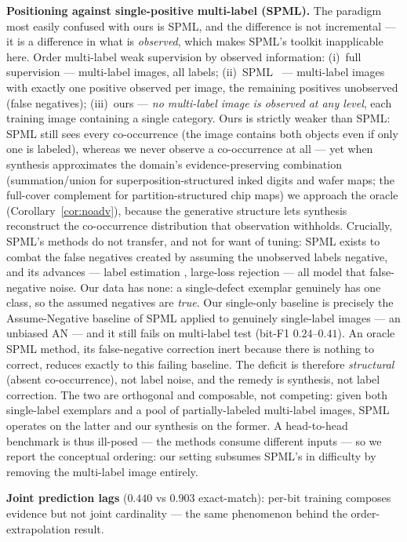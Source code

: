 \documentclass[11pt]{article}
\begin{document}
\textbf{Positioning against single-positive multi-label (SPML).} The
paradigm most easily confused with ours is SPML, and the difference is not
incremental --- it is a difference in what is \emph{observed}, which makes
SPML's toolkit inapplicable here. Order multi-label weak supervision by
observed information: (i)~full supervision --- multi-label images, all
labels; (ii)~SPML~\cite{cole2021spml,kim2022largeloss} --- multi-label
images with exactly one positive observed per image, the remaining positives
unobserved (false negatives); (iii)~ours --- \emph{no multi-label image is
observed at any level}, each training image containing a single category.
Ours is strictly weaker than SPML: SPML still sees every co-occurrence (the
image contains both objects even if only one is labeled), whereas we never
observe a co-occurrence at all --- yet when synthesis approximates the domain's
evidence-preserving combination (summation/union for superposition-structured inked
digits and wafer maps; the full-cover complement for partition-structured chip maps)
we approach the oracle
(Corollary~\ref{cor:noadv}), because the generative structure lets synthesis
reconstruct the co-occurrence distribution that observation withholds. Crucially, SPML's methods do not transfer, and not for want of
tuning: SPML exists to combat the false negatives created by assuming the
unobserved labels negative, and its advances --- label estimation
\cite{cole2021spml}, large-loss rejection \cite{kim2022largeloss} --- all
model that false-negative noise. Our data has none: a single-defect exemplar
genuinely has one class, so the assumed negatives are \emph{true}. Our
single-only baseline is precisely the Assume-Negative baseline of SPML applied
to genuinely single-label images --- an unbiased AN --- and it still fails on
multi-label test (bit-F1 $0.24$--$0.41$). An oracle SPML method, its
false-negative correction inert because there is nothing to correct, reduces
exactly to this failing baseline. The deficit is therefore \emph{structural}
(absent co-occurrence), not label noise, and the remedy is synthesis, not
label correction. The two are orthogonal and composable, not competing: given
both single-label exemplars and a pool of partially-labeled multi-label
images, SPML operates on the latter and our synthesis on the former. A
head-to-head benchmark is thus ill-posed --- the methods consume different
inputs --- so we report the conceptual ordering: our setting subsumes SPML's
in difficulty by removing the multi-label image entirely.

\textbf{Joint prediction lags} ($0.440$ vs $0.903$ exact-match): per-bit
training composes evidence but not joint cardinality --- the same
phenomenon behind the order-extrapolation result.
\end{document}
